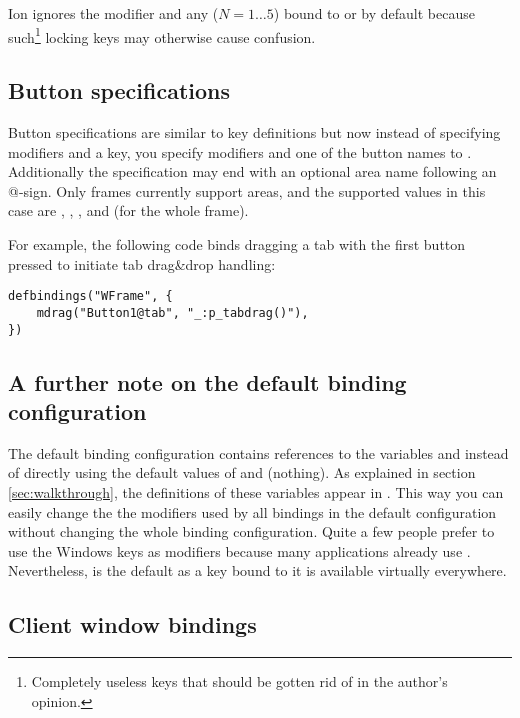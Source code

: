 Ion ignores the  modifier and any  ($N=1{\ldots} 5$)
bound to  or
by default because such\footnote{Completely useless keys that should be
gotten rid of in the author's opinion.} locking keys may otherwise
cause confusion.


\subsection{Button specifications}

Button specifications are similar to key definitions but now
instead of specifying modifiers and a key, you specify modifiers
and one of the button names  to
. Additionally the
specification may end with an optional area name following an @-sign.
Only frames currently support areas, and the supported values in this
case are
, , ,  and
 (for the whole frame).

For example, the following code binds dragging a tab with the first 
button pressed to initiate tab drag\&drop handling:

\begin{verbatim}
defbindings("WFrame", {
    mdrag("Button1@tab", "_:p_tabdrag()"),
})
\end{verbatim}

\subsection{A further note on the default binding configuration}

The default binding configuration contains references to the variables
 and  instead of directly using the default
values of  and  (nothing). As explained in
section \ref{sec:walkthrough}, the definitions of these variables
appear in . This way you can easily change the the
modifiers used by all bindings in the default configuration without 
changing the whole binding configuration. Quite a few people prefer 
to use the Windows keys as modifiers because many applications already
use . Nevertheless,  is the default as a key bound 
to it is available virtually everywhere.


\subsection{Client window bindings}

